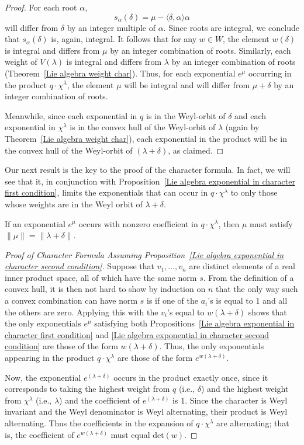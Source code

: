 \begin{proof}
For each root $\alpha$,
\[s_\alpha(\delta)=\mu-\langle\delta,\alpha\rangle\alpha\]
will differ from $\delta$ by an integer multiple of $\alpha$. Since roots are integral, we conclude that $s_\alpha(\delta)$ is, again, integral. It follows that for any $w\in W$, the element $w(\delta)$ is integral and differs from $\mu$ by an integer combination of roots. Similarly, each weight of $V(\lambda)$ is integral and differs from $\lambda$ by an integer combination of roots (Theorem~\ref{Lie algebra weight char}). Thus, for each exponential $e^{\mu}$ occurring in the product $q\cdot\chi^\lambda$, the element $\mu$ will be integral and will differ from $\mu+\delta$ by an integer combination of roots.\par
Meanwhile, since each exponential in $q$ is in the Weyl-orbit of $\delta$ and each exponential in $\chi^\lambda$ is in the convex hull of the Weyl-orbit of $\lambda$ (again by Theorem~\ref{Lie algebra weight char}), each exponential in the product will be in the convex hull of the Weyl-orbit of $(\lambda+\delta)$, as claimed.
\end{proof}
Our next result is the key to the proof of the character formula. In fact, we will see that it, in conjunction with Proposition~\ref{Lie algebra exponential in character first condition}, limits the exponentials that can occur in $q\cdot\chi^\lambda$ to only those whose weights are in the Weyl orbit of $\lambda+\delta$.
\begin{proposition}\label{Lie algebra exponential in character second condition}
If an exponential $e^{\mu}$ occurs with nonzero coefficient in $q\cdot\chi^\lambda$, then $\mu$ must satisfy $\|\mu\|=\|\lambda+\delta\|$.
\end{proposition}
\begin{proof}[Proof of Character Formula Assuming Proposition~\ref{Lie algebra exponential in character second condition}]
Suppose that $v_1,\dots,v_n$ are distinct elements of a real inner product space, all of which have the same norm $s$. From the definition of a convex hull, it is then not hard to show by induction on $n$ that the only way such a convex combination can have norm $s$ is if one of the $a_i$'s is equal to 1 and all the others are zero. Applying this with the $v_i$'s equal to $w(\lambda+\delta)$ shows that the only exponentials $e^{\mu}$ satisfying both Propositions~\ref{Lie algebra exponential in character first condition} and \ref{Lie algebra exponential in character second condition} are those of the form $w(\lambda+\delta)$. Thus, the only exponentials appearing in the product $q\cdot\chi^\lambda$ are those of the form $e^{w(\lambda+\delta)}$.\par
Now, the exponential $e^{(\lambda+\delta)}$ occurs in the product exactly once, since it corresponds to taking the highest weight from $q$ (i.e., $\delta$) and the highest weight from $\chi^\lambda$ (i.e., $\lambda$) and the coefficient of $e^{(\lambda+\delta)}$ is $1$. Since the character is Weyl invariant and the Weyl denominator is Weyl alternating, their product is Weyl alternating. Thus the coefficients in the expansion of $q\cdot\chi^\lambda$ are alternating; that is, the coefficient of $e^{w(\lambda+\delta)}$ must equal $\mathrm{det}(w)$.
\end{proof}
